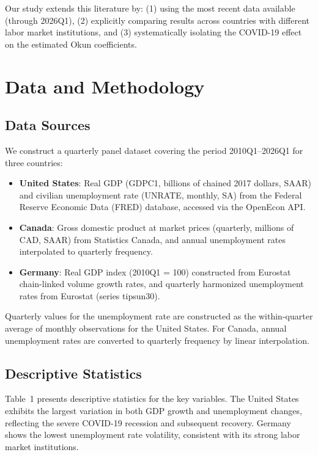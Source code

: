 \documentclass[12pt,a4paper]{article}
\begin{document}
Our study extends this literature by: (1) using the most recent data available (through 2026Q1), (2) explicitly comparing results across countries with different labor market institutions, and (3) systematically isolating the COVID-19 effect on the estimated Okun coefficients.

\section{Data and Methodology}

\subsection{Data Sources}

We construct a quarterly panel dataset covering the period 2010Q1--2026Q1 for three countries:

\begin{itemize}
    \item \textbf{United States}: Real GDP (GDPC1, billions of chained 2017 dollars, SAAR) and civilian unemployment rate (UNRATE, monthly, SA) from the Federal Reserve Economic Data (FRED) database, accessed via the OpenEcon API.
    \item \textbf{Canada}: Gross domestic product at market prices (quarterly, millions of CAD, SAAR) from Statistics Canada, and annual unemployment rates interpolated to quarterly frequency.
    \item \textbf{Germany}: Real GDP index (2010Q1 = 100) constructed from Eurostat chain-linked volume growth rates, and quarterly harmonized unemployment rates from Eurostat (series tipsun30).
\end{itemize}

Quarterly values for the unemployment rate are constructed as the within-quarter average of monthly observations for the United States. For Canada, annual unemployment rates are converted to quarterly frequency by linear interpolation.

\subsection{Descriptive Statistics}

Table~1 presents descriptive statistics for the key variables. The United States exhibits the largest variation in both GDP growth and unemployment changes, reflecting the severe COVID-19 recession and subsequent recovery. Germany shows the lowest unemployment rate volatility, consistent with its strong labor market institutions.
\end{document}
